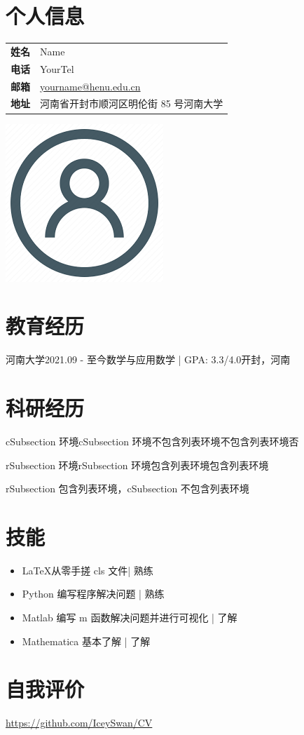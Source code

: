 \documentclass{HENU-CV}
\begin{document}
\section{个人信息}
\begin{minipage}{0.75\textwidth}
        \begin{tabular}{ll}
        \textbf{姓名} & Name          \\
        \textbf{电话} & YourTel       \\
        \textbf{邮箱} & \href{mailto:yourname@henu.edu.cn}{yourname@henu.edu.cn} \\
        \textbf{地址} & 河南省开封市顺河区明伦街 85 号河南大学        
        \end{tabular}
\end{minipage}
\hfill
\begin{minipage}{0.3\textwidth}
    \includegraphics[height=0.4\textwidth]{images/avatar.png}
\end{minipage}
\section{教育经历}

\begin{cSubsection}{河南大学}{2021.09 - 至今}{数学与应用数学 | GPA: 3.3/4.0}{开封，河南}
\end{cSubsection}


\section{科研经历}
\begin{cSubsection}{cSubsection 环境}{cSubsection 环境}{不包含列表环境}{不包含列表环境否}
\end{cSubsection}

\begin{rSubsection}{rSubsection 环境}{rSubsection 环境}{包含列表环境}{包含列表环境}
    \item rSubsection 包含列表环境，cSubsection 不包含列表环境
\end{rSubsection}

\section{技能}

\begin{itemize}
    \item \LaTeX \hfill 从零手搓 cls 文件| 熟练
    \item Python \hfill 编写程序解决问题 | 熟练
    \item Matlab \hfill 编写 m 函数解决问题并进行可视化 | 了解
    \item Mathematica \hfill 基本了解 | 了解
\end{itemize}

\section{自我评价}
\href{https://github.com/IceySwan/CV}{https://github.com/IceySwan/CV}
\end{document}
